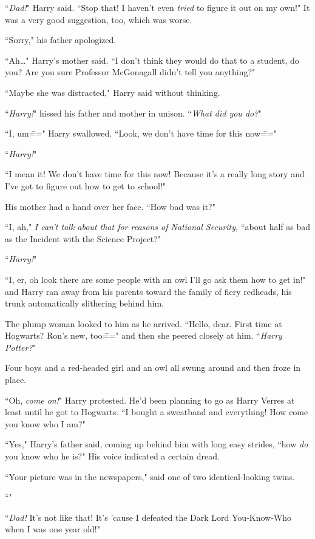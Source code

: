 ``\emph{Dad!}" Harry said. ``Stop that! I haven't even \emph{tried} to figure it out on my own!" It was a very good suggestion, too, which was worse.

``Sorry," his father apologized.

``Ah{\ldots}" Harry's mother said. ``I don't think they would do that to a student, do you? Are you sure Professor McGonagall didn't tell you anything?"

``Maybe she was distracted," Harry said without thinking.

``\emph{Harry!}" hissed his father and mother in unison. ``\emph{What did you do?}"

``I, um\===" Harry swallowed. ``Look, we don't have time for this now\==="

``\emph{Harry!}"

``I mean it! We don't have time for this now! Because it's a really long story and I've got to figure out how to get to school!"

His mother had a hand over her face. ``How bad was it?"

``I, ah," \emph{I can't talk about that for reasons of National Security,} ``about half as bad as the Incident with the Science Project?"

``\emph{Harry!}"

``I, er, oh look there are some people with an owl I'll go ask them how to get in!" and Harry ran away from his parents toward the family of fiery redheads, his trunk automatically slithering behind him.

The plump woman looked to him as he arrived. ``Hello, dear. First time at Hogwarts? Ron's new, too\===" and then she peered closely at him. ``\emph{Harry Potter?}"

Four boys and a red-headed girl and an owl all swung around and then froze in place.

``Oh, \emph{come on!}" Harry protested. He'd been planning to go as Harry Verres at least until he got to Hogwarts. ``I bought a sweatband and everything! How come you know who I am?"

``Yes," Harry's father said, coming up behind him with long easy strides, ``how \emph{do} you know who he is?" His voice indicated a certain dread.

``Your picture was in the newspapers," said one of two identical-looking twins.

``"

``\emph{Dad!} It's not like that! It's 'cause I defeated the Dark Lord You-Know-Who when I was one year old!"


